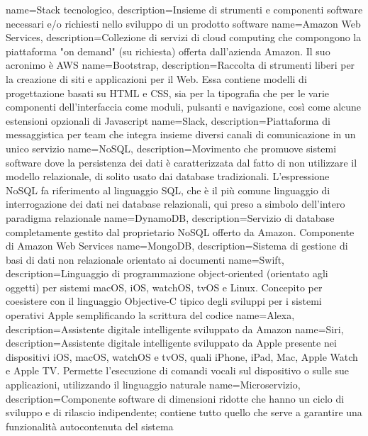  {
	name=Stack tecnologico,
	description={Insieme di strumenti e componenti software necessari e/o richiesti nello sviluppo
	di un prodotto software}
}
 {
	name=Amazon Web Services,
	description={Collezione di servizi di cloud computing che compongono la piattaforma
	"on demand" (su richiesta) offerta dall'azienda Amazon. Il suo acronimo è AWS}
}
 {
	name=Bootstrap,
	description={Raccolta di strumenti liberi per la creazione di siti e applicazioni per il Web.
	Essa contiene modelli di progettazione basati su HTML e CSS, sia per la tipografia che per le
	varie componenti dell'interfaccia come moduli, pulsanti e navigazione, così come alcune
	estensioni opzionali di Javascript}
}
 {
	name=Slack,
	description={Piattaforma di messaggistica per team che integra insieme diversi canali di
	comunicazione in un unico servizio}
}
 {
	name=NoSQL,
	description={Movimento che promuove sistemi software dove la persistenza dei dati è
	caratterizzata dal fatto di non utilizzare il modello relazionale, di solito usato dai
	database tradizionali. L'espressione NoSQL fa riferimento al linguaggio SQL, che è il più
	comune linguaggio di interrogazione dei dati nei database relazionali, qui preso a simbolo
	dell'intero paradigma relazionale}
}
 {
	name=DynamoDB,
	description={Servizio di database completamente gestito dal proprietario NoSQL offerto da
	Amazon. Componente di Amazon Web Services}
}
 {
	name=MongoDB,
	description={Sistema di gestione di basi di dati non relazionale orientato ai documenti}
}
 {
	name=Swift,
	description={Linguaggio di programmazione object-oriented (orientato agli oggetti) per
	sistemi macOS, iOS, watchOS, tvOS e Linux. Concepito per coesistere con il linguaggio
	Objective-C tipico degli sviluppi per i sistemi operativi Apple semplificando
	la scrittura del codice}
}
 {
	name=Alexa,
	description={Assistente digitale intelligente sviluppato da Amazon}
}
 {
	name=Siri,
	description={Assistente digitale intelligente sviluppato da Apple presente nei dispositivi	iOS, macOS, watchOS e tvOS, quali iPhone, iPad, Mac, Apple Watch e Apple TV. Permette l'esecuzione di comandi vocali sul dispositivo o sulle sue applicazioni, utilizzando il linguaggio naturale}
}
 {
	name=Microservizio,
	description={Componente software di dimensioni ridotte che hanno un ciclo di sviluppo e di
	rilascio indipendente; contiene tutto quello che serve a garantire una funzionalità
	autocontenuta del sistema}
}

